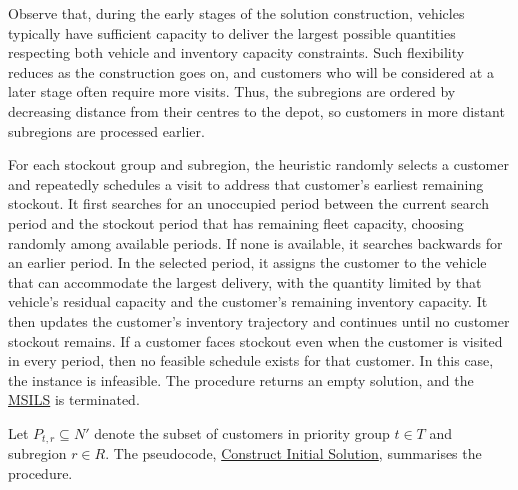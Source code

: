 \documentclass{article}
\begin{document}
Observe that, during the early stages of the solution construction, vehicles typically have sufficient capacity to deliver the largest possible quantities respecting both vehicle and inventory capacity constraints. Such flexibility reduces as the construction goes on, and customers who will be considered at a later stage often require more visits. Thus, the subregions are ordered by decreasing distance from their centres to the depot, so customers in more distant subregions are processed earlier.


For each stockout group and subregion, the heuristic randomly selects a customer and repeatedly schedules a visit to address that customer's earliest remaining stockout. It first searches for an unoccupied period between the current search period and the stockout period that has remaining fleet capacity, choosing randomly among available periods. If none is available, it searches backwards for an earlier period. In the selected period, it assigns the customer to the vehicle that can accommodate the largest delivery, with the quantity limited by that vehicle's residual capacity and the customer's remaining inventory capacity. It then updates the customer's inventory trajectory and continues until no customer stockout remains. If a customer faces stockout even when the customer is visited in every period, then no feasible schedule exists for that customer. In this case, the instance is infeasible. The procedure returns an empty solution, and the \hyperref[alg:MSILS]{MSILS} is terminated. 

Let $P_{t,r} \subseteq N'$ denote the subset of customers in priority group $t\in T$ and subregion $r\in R$. The pseudocode, \hyperref[alg:InitialSchedule]{Construct Initial Solution}, summarises the procedure.
\end{document}
